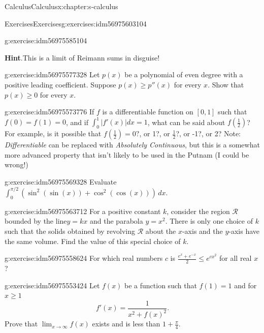 \documentclass[twoside,10pt,]{book}
\newcommand{\blocktitlefont}{\relax}
\numberwithin{equation}{section}
\begin{document}
\begin{chapterptx}{Calculus}{}{Calculus}{}{}{x:chapter:s-calculus}
\begin{exercises-section}{Exercises}{}{Exercises}{}{}{g:exercises:idm56975603104}
\begin{divisionexercise}{4}{}{}{g:exercise:idm56975585104}
\par\smallskip%
\noindent\textbf{\blocktitlefont Hint}.\hypertarget{g:hint:idm56975578816}{}\quad{}This is a limit of Reimann sums in disguise!%
\end{divisionexercise}%
\begin{divisionexercise}{5}{}{}{g:exercise:idm56975577328}%
Let \(p(x)\) be a polynomial of even degree with a positive leading coefficient. Suppose \(p(x)\geq p''(x)	\) for every \(x\). Show that \(p(x) \geq  0\) for every \(x\).%
\end{divisionexercise}%
\begin{divisionexercise}{6}{}{}{g:exercise:idm56975573776}%
If \(f\) is a differentiable function on \([0,1]\) such that \(f(0)=f(1)=0\), and if \(\int_0^1 \left| f'(x)\right| dx=1\), what can be said about \(f\left(\frac{1}{2}\right)\)? For example, is it possible that \(f\left(\frac{1}{2}\right)=0?\), or 1?, or \(\frac{1}{2}\)?, or -1?, or 2? Note: \emph{Differentiable} can be replaced with \emph{Absolutely Continuous}, but this is a somewhat more advanced property that isn't likely to be used in the Putnam (I could be wrong!)%
\end{divisionexercise}%
\begin{divisionexercise}{7}{}{}{g:exercise:idm56975569328}%
Evaluate \(\int_{ 0}^{ \pi /2} \left(\sin ^2(\sin (x))+\cos ^2(\cos (x))\right) \, dx\).%
\end{divisionexercise}%
\begin{divisionexercise}{8}{}{}{g:exercise:idm56975563712}%
For a positive constant \(k\), consider the region \(\mathcal{R}\) bounded by the line\(y = k x\) and the parabola \(y = x^2\). There is only one choice of \(k\) such that the solids obtained by revolving \(\mathcal{R}\) about the \(x\)-axis and the \(y\)-axis have the same volume. Find the value of this special choice of \(k\).%
\end{divisionexercise}%
\begin{divisionexercise}{9}{}{}{g:exercise:idm56975558624}%
For which real numbers \(c\) is \(\frac{e^x+ e^{-x}}{2}\leq e^{c x^2}\) for all real \(x\)?%
\end{divisionexercise}%
\begin{divisionexercise}{10}{}{}{g:exercise:idm56975553424}%
Let \(f(x)\) be a function such that \(f(1)=1\) and for \(x\geq 1\)%
\begin{equation*}
f'(x)=\frac{1}{x^2+ f(x)^2}\text{.}
\end{equation*}
Prove that \(\lim_{x\to \infty } f(x)\) exists and is less than \(1+\frac{\pi}{4}\).%

\end{divisionexercise}
\end{exercises-section}
\end{chapterptx}
\end{document}
